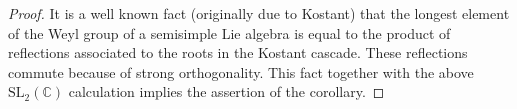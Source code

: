 \documentclass[10pt,a4paper]{amsart}
\newcommand{\C}{\mathbb C}
\begin{document}
\begin{proof}
It is a well known fact (originally due to Kostant) that the longest element of the Weyl group of a semisimple Lie algebra is equal to the product of reflections associated to the roots in the Kostant cascade. These reflections commute because of strong orthogonality. This fact together with the above $\mathrm{SL}_2(\C)$ calculation implies the assertion of the corollary. 
\end{proof}
\end{document}

